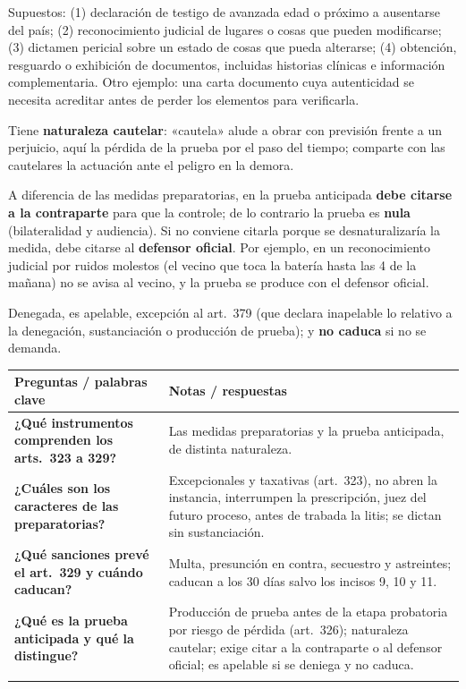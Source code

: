 \documentclass[12pt,oneside]{book}
\newenvironment{cornell}[1]{%
  \par\medskip\noindent{\small\bfseries Cuadro Cornell: #1}\par\smallskip
  \begin{longtable}{|>{\RaggedRight\arraybackslash}p{0.27\textwidth}|>{\RaggedRight\arraybackslash}p{0.66\textwidth}|}
  \hline
  \textbf{\small Preguntas / palabras clave} & \textbf{\small Notas / respuestas} \\ \hline\endhead
}{\end{longtable}\par\medskip}
\newcommand{\cqa}[2]{\textbf{#1} & #2 \\ \hline}
\newcommand{\cornellsummary}[1]{\multicolumn{2}{|p{0.95\textwidth}|}{\textbf{Resumen:} #1} \\ \hline}
\begin{document}
Supuestos: (1) declaración de testigo de avanzada edad o próximo a ausentarse del país; (2) reconocimiento judicial de lugares o cosas que pueden modificarse; (3) dictamen pericial sobre un estado de cosas que pueda alterarse; (4) obtención, resguardo o exhibición de documentos, incluidas historias clínicas e información complementaria. Otro ejemplo: una carta documento cuya autenticidad se necesita acreditar antes de perder los elementos para verificarla. %

Tiene \textbf{naturaleza cautelar}: «cautela» alude a obrar con previsión frente a un perjuicio, aquí la pérdida de la prueba por el paso del tiempo; comparte con las cautelares la actuación ante el peligro en la demora.

\begin{importante}
A diferencia de las medidas preparatorias, en la prueba anticipada \textbf{debe citarse a la contraparte} para que la controle; de lo contrario la prueba es \textbf{nula} (bilateralidad y audiencia). Si no conviene citarla porque se desnaturalizaría la medida, debe citarse al \textbf{defensor oficial}. Por ejemplo, en un reconocimiento judicial por ruidos molestos (el vecino que toca la batería hasta las 4 de la mañana) no se avisa al vecino, y la prueba se produce con el defensor oficial.
\end{importante}

Denegada, es apelable, excepción al art.~379 (que declara inapelable lo relativo a la denegación, sustanciación o producción de prueba); y \textbf{no caduca} si no se demanda.

\begin{cornell}{diligencias preliminares}
\cqa{¿Qué instrumentos comprenden los arts.~323 a 329?}{Las medidas preparatorias y la prueba anticipada, de distinta naturaleza.}
\cqa{¿Cuáles son los caracteres de las preparatorias?}{Excepcionales y taxativas (art.~323), no abren la instancia, interrumpen la prescripción, juez del futuro proceso, antes de trabada la litis; se dictan sin sustanciación.}
\cqa{¿Qué sanciones prevé el art.~329 y cuándo caducan?}{Multa, presunción en contra, secuestro y astreintes; caducan a los 30 días salvo los incisos 9, 10 y 11.}
\cqa{¿Qué es la prueba anticipada y qué la distingue?}{Producción de prueba antes de la etapa probatoria por riesgo de pérdida (art.~326); naturaleza cautelar; exige citar a la contraparte o al defensor oficial; es apelable si se deniega y no caduca.}
\cornellsummary{Las diligencias preliminares preparan la demanda (medidas preparatorias, que caducan y no controvierten) o resguardan la prueba en peligro (prueba anticipada, bilateral y sin caducidad).}
\end{cornell}
\end{document}
